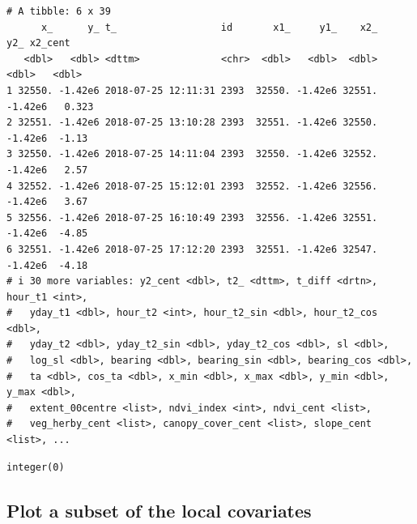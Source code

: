 \documentclass[
  letterpaper,
  DIV=11,
  numbers=noendperiod]{scrartcl}
\newenvironment{Shaded}{\begin{snugshade}}{\end{snugshade}}
\newcommand{\CommentTok}[1]{\textcolor[rgb]{0.37,0.37,0.37}{#1}}
\newcommand{\DecValTok}[1]{\textcolor[rgb]{0.68,0.00,0.00}{#1}}
\newcommand{\FunctionTok}[1]{\textcolor[rgb]{0.28,0.35,0.67}{#1}}
\newcommand{\NormalTok}[1]{\textcolor[rgb]{0.00,0.23,0.31}{#1}}
\newcommand{\OtherTok}[1]{\textcolor[rgb]{0.00,0.23,0.31}{#1}}
\newcommand{\SpecialCharTok}[1]{\textcolor[rgb]{0.37,0.37,0.37}{#1}}
\begin{document}
\begin{verbatim}
# A tibble: 6 x 39
      x_      y_ t_                  id       x1_     y1_    x2_     y2_ x2_cent
   <dbl>   <dbl> <dttm>              <chr>  <dbl>   <dbl>  <dbl>   <dbl>   <dbl>
1 32550. -1.42e6 2018-07-25 12:11:31 2393  32550. -1.42e6 32551. -1.42e6   0.323
2 32551. -1.42e6 2018-07-25 13:10:28 2393  32551. -1.42e6 32550. -1.42e6  -1.13 
3 32550. -1.42e6 2018-07-25 14:11:04 2393  32550. -1.42e6 32552. -1.42e6   2.57 
4 32552. -1.42e6 2018-07-25 15:12:01 2393  32552. -1.42e6 32556. -1.42e6   3.67 
5 32556. -1.42e6 2018-07-25 16:10:49 2393  32556. -1.42e6 32551. -1.42e6  -4.85 
6 32551. -1.42e6 2018-07-25 17:12:20 2393  32551. -1.42e6 32547. -1.42e6  -4.18 
# i 30 more variables: y2_cent <dbl>, t2_ <dttm>, t_diff <drtn>, hour_t1 <int>,
#   yday_t1 <dbl>, hour_t2 <int>, hour_t2_sin <dbl>, hour_t2_cos <dbl>,
#   yday_t2 <dbl>, yday_t2_sin <dbl>, yday_t2_cos <dbl>, sl <dbl>,
#   log_sl <dbl>, bearing <dbl>, bearing_sin <dbl>, bearing_cos <dbl>,
#   ta <dbl>, cos_ta <dbl>, x_min <dbl>, x_max <dbl>, y_min <dbl>, y_max <dbl>,
#   extent_00centre <list>, ndvi_index <int>, ndvi_cent <list>,
#   veg_herby_cent <list>, canopy_cover_cent <list>, slope_cent <list>, ...
\end{verbatim}

\begin{Shaded}
\end{Shaded}

\begin{verbatim}
integer(0)
\end{verbatim}

\subsection{Plot a subset of the local
covariates}\label{plot-a-subset-of-the-local-covariates}

\begin{Shaded}
\end{Shaded}
\end{document}
